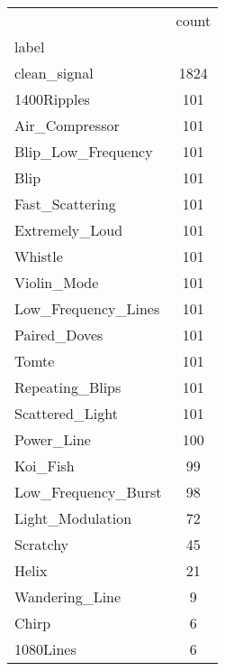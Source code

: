 \begin{tabular}{lc}
\toprule
 & count \\
label &  \\
\midrule
clean\_signal & 1824 \\
1400Ripples & 101 \\
Air\_Compressor & 101 \\
Blip\_Low\_Frequency & 101 \\
Blip & 101 \\
Fast\_Scattering & 101 \\
Extremely\_Loud & 101 \\
Whistle & 101 \\
Violin\_Mode & 101 \\
Low\_Frequency\_Lines & 101 \\
Paired\_Doves & 101 \\
Tomte & 101 \\
Repeating\_Blips & 101 \\
Scattered\_Light & 101 \\
Power\_Line & 100 \\
Koi\_Fish & 99 \\
Low\_Frequency\_Burst & 98 \\
Light\_Modulation & 72 \\
Scratchy & 45 \\
Helix & 21 \\
Wandering\_Line & 9 \\
Chirp & 6 \\
1080Lines & 6 \\
\bottomrule
\end{tabular}
